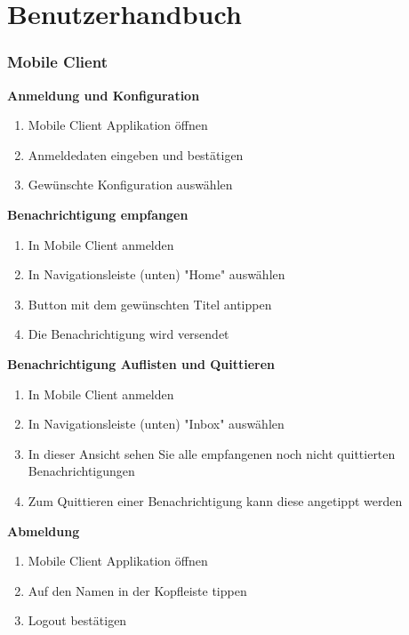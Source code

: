 \section{Benutzerhandbuch}

\subsubsection*{Mobile Client}

\textbf{Anmeldung und Konfiguration}

\begin{enumerate}
    \item Mobile Client Applikation öffnen
    \item Anmeldedaten eingeben und bestätigen
    \item Gewünschte Konfiguration auswählen
\end{enumerate}

\textbf{Benachrichtigung empfangen}

\begin{enumerate}
    \item In Mobile Client anmelden
    \item In Navigationsleiste (unten) "Home" auswählen
    \item Button mit dem gewünschten Titel antippen
    \item Die Benachrichtigung wird versendet
\end{enumerate}

\textbf{Benachrichtigung Auflisten und Quittieren}

\begin{enumerate}
    \item In Mobile Client anmelden
    \item In Navigationsleiste (unten) "Inbox" auswählen
    \item In dieser Ansicht sehen Sie alle empfangenen noch nicht quittierten Benachrichtigungen
    \item Zum Quittieren einer Benachrichtigung kann diese angetippt werden
\end{enumerate}

\textbf{Abmeldung}

\begin{enumerate}
    \item Mobile Client Applikation öffnen
    \item Auf den Namen in der Kopfleiste tippen
    \item Logout bestätigen
\end{enumerate}

